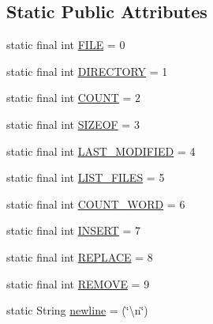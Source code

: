 \subsection*{Static Public Attributes}
\begin{DoxyCompactItemize}
\item 
static final int \hyperlink{classcom_1_1poly_1_1nlp_1_1filekommander_1_1_file_kommander_abc599ad8072f7091b61322af4d8fb40e}{F\-I\-L\-E} = 0
\item 
static final int \hyperlink{classcom_1_1poly_1_1nlp_1_1filekommander_1_1_file_kommander_a081a142e5d7bb0d0fe5cf38c2f4dc086}{D\-I\-R\-E\-C\-T\-O\-R\-Y} = 1
\item 
static final int \hyperlink{classcom_1_1poly_1_1nlp_1_1filekommander_1_1_file_kommander_ae3f898b3eba16a0ea7fde82bc1bb8352}{C\-O\-U\-N\-T} = 2
\item 
static final int \hyperlink{classcom_1_1poly_1_1nlp_1_1filekommander_1_1_file_kommander_a6775052df5b5feaa10c69e1496e59f67}{S\-I\-Z\-E\-O\-F} = 3
\item 
static final int \hyperlink{classcom_1_1poly_1_1nlp_1_1filekommander_1_1_file_kommander_a0e06efa81ab1100008a3131c6d92ceca}{L\-A\-S\-T\-\_\-\-M\-O\-D\-I\-F\-I\-E\-D} = 4
\item 
static final int \hyperlink{classcom_1_1poly_1_1nlp_1_1filekommander_1_1_file_kommander_a682faeb610efe2c1a1d8f9c20d972d82}{L\-I\-S\-T\-\_\-\-F\-I\-L\-E\-S} = 5
\item 
static final int \hyperlink{classcom_1_1poly_1_1nlp_1_1filekommander_1_1_file_kommander_a1c18ad75cdd0b8963695c1a8fd378b9c}{C\-O\-U\-N\-T\-\_\-\-W\-O\-R\-D} = 6
\item 
static final int \hyperlink{classcom_1_1poly_1_1nlp_1_1filekommander_1_1_file_kommander_aea640bc0ab06be33089d86d4847bcfbd}{I\-N\-S\-E\-R\-T} = 7
\item 
static final int \hyperlink{classcom_1_1poly_1_1nlp_1_1filekommander_1_1_file_kommander_a43509f431e53076b0419cd5560077132}{R\-E\-P\-L\-A\-C\-E} = 8
\item 
static final int \hyperlink{classcom_1_1poly_1_1nlp_1_1filekommander_1_1_file_kommander_ae5cf939b72c1ec4e11127b45fdd5e637}{R\-E\-M\-O\-V\-E} = 9
\item 
static String \hyperlink{classcom_1_1poly_1_1nlp_1_1filekommander_1_1_file_kommander_a0076b66fb48530c9171b3c7294e17ce1}{newline} = (\char`\"{}\textbackslash{}n\char`\"{})
\end{DoxyCompactItemize}
